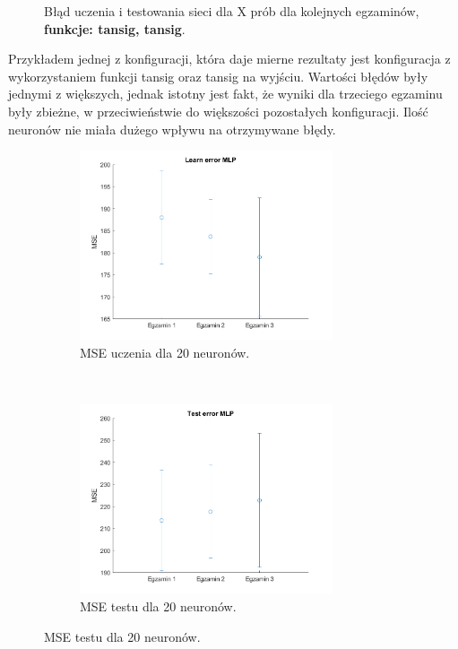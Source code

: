 \documentclass[12pt]{article}
\begin{document}
\begin{figure}[H]
\caption{Błąd uczenia i testowania sieci dla X prób dla kolejnych egzaminów, \textbf{funkcje: tansig, tansig}.}
\end{figure}
Przykładem jednej z konfiguracji, która daje mierne rezultaty jest konfiguracja z wykorzystaniem funkcji tansig oraz tansig na wyjściu. Wartości błędów były jednymi z większych, jednak istotny jest fakt, że wyniki dla trzeciego egzaminu były zbieżne, w przeciwieństwie do większości pozostałych konfiguracji. Ilość neuronów nie miała dużego wpływu na otrzymywane błędy.



\begin{figure}[H]
\centering
\begin{subfigure}[t]{0.48\textwidth} 
\centering
\includegraphics[height=2.2in]{tansig_purelin20_learn.png}
\caption{MSE uczenia dla 20 neuronów.}
\end{subfigure}
~~
\begin{subfigure}[t]{0.48\textwidth} 
\centering
\includegraphics[height=2.2in]{tansig_purelin20_test.png}
\caption{MSE testu dla 20 neuronów.}
\end{subfigure}


\end{figure}
\end{document}

